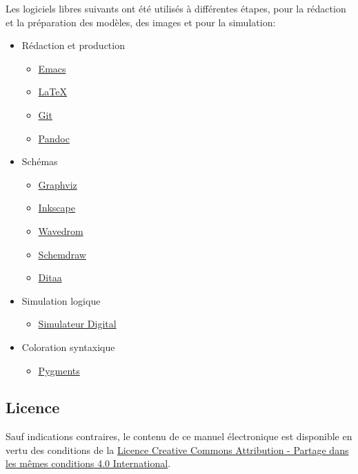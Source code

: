 \documentclass[11pt]{article}
\begin{document}
Les logiciels libres suivants ont été utilisés à différentes étapes,
pour la rédaction et la préparation des modèles, des images et pour la
simulation:

\begin{itemize}
\item Rédaction et production
\begin{itemize}
\item \href{https://www.gnu.org/software/emacs/}{Emacs}
\item \href{https://www.latex-project.org/}{\LaTeX{}}
\item \href{https://git-scm.com}{Git}
\item \href{https://pandoc.org/}{Pandoc}
\end{itemize}
\item Schémas
\begin{itemize}
\item \href{https://graphviz.org/}{Graphviz}
\item \href{https://inkscape.org}{Inkscape}
\item \href{https://wavedrom.com/}{Wavedrom}
\item \href{https://schemdraw.readthedocs.io/en/latest/}{Schemdraw}
\item \href{https://ditaa.sourceforge.net/}{Ditaa}
\end{itemize}
\item Simulation logique
\begin{itemize}
\item \href{https://github.com/hneemann/Digital}{Simulateur Digital}
\end{itemize}
\item Coloration syntaxique
\begin{itemize}
\item \href{https://pygments.org/docs/quickstart/}{Pygments}
\end{itemize}
\end{itemize}

\subsection*{Licence}
\label{sec:org3d9c7f4}

\begin{center}
\href{https://creativecommons.org/licenses/by/4.0/deed.fr}{} 
\end{center}


Sauf indications contraires, le contenu de ce manuel électronique est
disponible en vertu des conditions de la
\href{https://creativecommons.org/licenses/by/4.0/deed.fr}{Licence
Creative Commons Attribution - Partage dans les mêmes conditions 4.0
International}.
\end{document}
